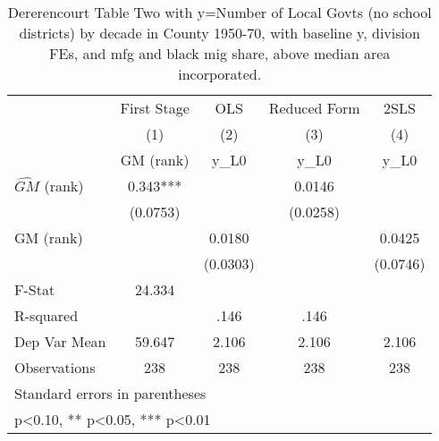 \begin{table}[htbp]\centering
\def\sym#1{\ifmmode^{#1}\else\(^{#1}\)\fi}
\caption{Dererencourt Table Two with y=Number of Local Govts (no school districts) by decade in County 1950-70, with baseline y, division FEs, and mfg and black mig share, above median area incorporated.}
\begin{tabular}{l*{4}{c}}
\toprule
                    & First Stage   &         OLS   &Reduced Form   &        2SLS   \\
                    &\multicolumn{1}{c}{(1)}&\multicolumn{1}{c}{(2)}&\multicolumn{1}{c}{(3)}&\multicolumn{1}{c}{(4)}\\
                    &\multicolumn{1}{c}{GM  (rank)}&\multicolumn{1}{c}{y\_L0}&\multicolumn{1}{c}{y\_L0}&\multicolumn{1}{c}{y\_L0}\\
\midrule
$\hat{GM}$ (rank)   &       0.343***&               &      0.0146   &               \\
                    &    (0.0753)   &               &    (0.0258)   &               \\
\addlinespace
GM  (rank)          &               &      0.0180   &               &      0.0425   \\
                    &               &    (0.0303)   &               &    (0.0746)   \\
\midrule
F-Stat              &      24.334   &               &               &               \\
R-squared           &               &        .146   &        .146   &               \\
Dep Var Mean        &      59.647   &       2.106   &       2.106   &       2.106   \\
Observations        &         238   &         238   &         238   &         238   \\
\bottomrule
\multicolumn{5}{l}{\footnotesize Standard errors in parentheses}\\
\multicolumn{5}{l}{\footnotesize * p<0.10, ** p<0.05, *** p<0.01}\\
\end{tabular}
\end{table}
